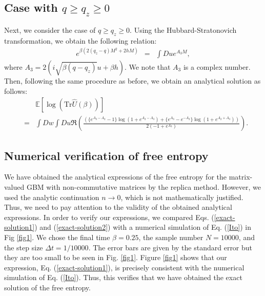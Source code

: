\documentclass[
aps,
pre,
showpacs
]{revtex4-1}
\newcommand{\be}{\begin{eqnarray}}
\newcommand{\ee}{\end{eqnarray}}
\newcommand{\no}{\nonumber}
\newcommand{\Tr}{\mbox{Tr} }
\begin{document}
\subsection{Case with $q \ge q_z\ge0$}
Next, we consider the case of $q \ge q_z \ge0$.
Using the Hubbard-Stratonovich transformation, we obtain the following relation:
\be
e^{ \beta\left( 2(q_z-q) M^2+2 h M \right)}
&=&  \int Du e^{ A_3 M },
\ee
where $A_3= 2\left(i\sqrt{\beta(q-q_z)} u+\beta h \right)$.
We note that $A_3$ is a complex number.
Then, following the same procedure as before, we obtain an analytical solution as follows: 
\be
&&\mathbb{E} \left[ \log\left( \Tr \hat{U}(\beta) \right) \right] 
\no\\
&=&\int Dw \int Du \Re\left( \frac{\left(\{e^{A_3-A_2}-1 \}\log(1+e^{A_2-A_3}) +\{ e^{A_3}-e^{-A_2} \}\log(1+e^{A_2+A_3}) \right)}{2(-1+e^{A_3})}  \right). \label{exact-solution2}
\ee


\subsection{Numerical verification of free entropy}
We have obtained the analytical expressions of the free entropy for the matrix-valued GBM with non-commutative matrices by the replica method.
However, we used the analytic continuation $n\rightarrow0$, which is not mathematically justified.
Thus, we need to pay attention to the validity of the obtained analytical expressions.
In order to verify our expressions, we compared Eqs. (\ref{exact-solution1}) and (\ref{exact-solution2}) with a numerical simulation of Eq. (\ref{Ito}) in Fig \ref{fig1}.
We chose the final time $\beta = 0.25$, the sample number $N=10000$, and the step size $\Delta t=1/10000$.
The error bars are given by the standard error but they are too small to be seen in Fig. \ref{fig1}.
Figure \ref{fig1} shows that our expression, Eq. (\ref{exact-solution1}), is precisely consistent with the numerical simulation of Eq. (\ref{Ito}).
Thus, this verifies that we have obtained the exact solution of the free entropy.
\end{document}
